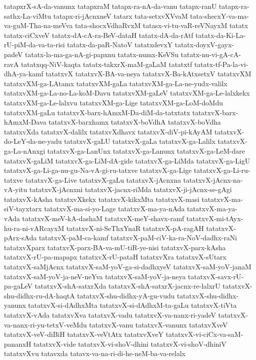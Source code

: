 {tatapxrX-sA-da-vanunx
tatapxraM
tatapx-ra-nA-da-vanu
tatapx-ranU
tatapx-ra-sathx-La-viMtu
tatapx-ri-jAcnxneV
tatarx
tata-setxvXVvaM
tata-shecxY-va-ma-va-guM-Tha-na-meVva
tata-shocxVdhaRvxM
tatasx-vi-tu-vaR-reVNayxM
tatatx
tatatx-ciCxveV
tatatx-dA-cA-ra-BeV-dataH
tatatx-dA-da-rAtf
tatatx-da-Ki-La-rU-piM-da-va-ta-risi
tatatx-da-paR-NatoV
tatatxdevxY
tatatx-doyxV-gayx-padeV
tatatx-la-ma-ga-nA-gi-papxnu
tatatx-numx-KeVSu
tatatx-nu-vi-gA-cA-ravA
tatatxqq-NiV-kaqta
tatatx-takxrX-maM-gaLaM
tatatxtf
tatatx-tf-Pa-la-vi-dhA-ya-kamf
tatatxvX
tatatxvX-BA-va-neya
tatatxvX-Ba-kAtxsetxV
tatatxvXM
tatatxvXM-ga-LAtamx
tatatxvXM-gaLa
tatatxvXM-ga-La-ne-yudx-valilx
tatatxvXM-ga-La-no-La-koM-Davu
tatatxvXM-gaLeV
tatatxvXM-ga-Le-lalxkekx
tatatxvXM-ga-Le-lalxvu
tatatxvXM-ga-Lige
tatatxvXM-ga-LoM-doMdu
tatatxvXM-gaLu
tatatxvX-barx-hAmxM-Da-diM-da-tatxtatx
tatatxvX-barx-hAmxM-Dava
tatatxvX-barxhamx
tatatxvX-boVdhA
tatatxvX-boVdha
tatatxvXda
tatatxvX-dalilx
tatatxvXdhavx
tatatxvX-diV-pi-kAyAM
tatatxvX-do-LeY-da-ne-yadu
tatatxvX-gaLU
tatatxvX-gaLa
tatatxvX-ga-Lalilx
tatatxvX-ga-La-nAnxgi
tatatxvX-ga-LanUnx
tatatxvX-ga-Lanunx
tatatxvX-ga-LeM-dare
tatatxvX-gaLiM
tatatxvX-ga-LiM-dA-gide
tatatxvX-ga-LiMda
tatatxvX-ga-LigU
tatatxvX-ga-Li-ga-nu-gu-Na-vA-gi-ru-tatxve
tatatxvX-ga-Lige
tatatxvX-ga-Li-ru-tatxve
tatatxvX-ga-Live
tatatxvX-gaLu
tatatxvX-jAcnxna
tatatxvX-jAcnx-na-vA-yitu
tatatxvX-jAcnxni
tatatxvX-jacnx-riMda
tatatxvX-ji-jAcnx-se-gAgi
tatatxvX-kAsha
tatatxvXkekx
tatatxvX-kikxMta
tatatxvX-masi
tatatxvX-ma-siV-tayxtarx
tatatxvX-ma-si-yo-Lage
tatatxvX-ma-ya-nAda
tatatxvX-ma-ya-vAda
tatatxvX-meV-kA-dashaM
tatatxvX-meY-shavx-ramf
tatatxvX-mi-tAyx-hu-ra-ni-vARcayxM
tatatxvX-ni-SeThxYnaR
tatatxvX-pA-ragAH
tatatxvX-pArx-sAda
tatatxvX-paM-ca-kamf
tatatxvX-paM-ciV-ka-ra-NoV-dadhx-raNi
tatatxvXparx
tatatxvX-parx-BA-va-mU-tiR-ye-nisi
tatatxvX-parx-kAsha
tatatxvX-rU-pa-mapapx
tatatxvX-rU-pataH
tatatxvXra
tatatxvX-sUtarx
tatatxvX-saMjAcnx
tatatxvX-saM-yoV-ga-si-dadhxyeV
tatatxvX-saM-yoV-janaM
tatatxvX-saM-yoV-ja-neV-neYva
tatatxvX-saM-yoV-ja-neya
tatatxvX-savx-rU-pa-gaLeV
tatatxvX-shA-satxrXda
tatatxvX-shA-satxrX-jacnx-re-lalxrU
tatatxvX-shu-didhx-ru-dA-haqtA
tatatxvX-shu-didhx-yA-gu-vudu
tatatxvX-shu-didhx-yanunx
tatatxvX-si-dAdhxMta
tatatxvX-si-dAdhxM-ta-gaLu
tatatxvX-tiVta
tatatxvX-vAda
tatatxvXva
tatatxvX-vadu
tatatxvX-va-nanx-ri-yadeV
tatatxvX-va-nanx-ri-yu-tetxV-veMdu
tatatxvX-vanu
tatatxvX-vanunx
tatatxvXveV
tatatxvX-veV-diBiH
tatatxvX-veVtAtx
tatatxvXveY
tatatxvX-vi-ciCx-va-saM-pananxH
tatatxvX-vide
tatatxvX-vi-shoV-dhini
tatatxvX-vi-shoV-dhiniV
tatatxvXvu
tatavxda
tatavx-va-na-ri-di-he-neM-ba-va-relalx
}
